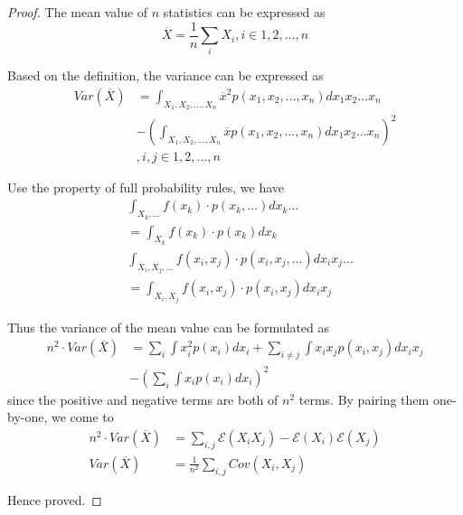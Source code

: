 \documentclass[../concepts.tex]{subfiles}
\begin{document}
\begin{proof}
    The mean value of $n$ statistics can be expressed as
    \begin{equation*}
        \overline{X} = \frac{1}{n} \sum_{i} X_i,
        i \in 1, 2, \dots, n
    \end{equation*}

    Based on the definition, the variance can be expressed as
    \begin{align*}
        Var(\overline{X}) & =  \int_{X_1, X_2, \dots, X_n} {\overline{x}}^2 p(x_1, x_2, \dots, x_n) dx_1 x_2 \dots x_n \\
                          & - (\int_{X_1, X_2, \dots, X_n} \overline{x} p(x_1, x_2, \dots, x_n) dx_1 x_2 \dots x_n)^2  \\
                          & , i, j \in 1, 2, \dots, n
    \end{align*}

    Use the property of full probability rules, we have
    \begin{align*}
         & \int_{X_k, \dots} f(x_k) \cdot p(x_k, \dots) dx_k \dots                    \\
         & = \int_{X_k} f(x_k) \cdot p(x_k) dx_k                                      \\
         & \int_{X_i, X_j, \dots} f(x_i, x_j) \cdot p(x_i, x_j, \dots) dx_i x_j \dots \\
         & = \int_{X_i, X_j} f(x_i, x_j) \cdot p(x_i, x_j) dx_i x_j
    \end{align*}

    Thus the variance of the mean value can be formulated as
    \begin{align*}
        n^2 \cdot Var(\overline{X}) & = \sum_i \int x_i^2 p(x_i) dx_i + \sum_{i \neq j} \int x_i x_j p(x_i, x_j) dx_i x_j \\
                                    & - (\sum_i \int x_i p(x_i) dx_i)^2
    \end{align*}
    since the positive and negative terms are both of $n^2$ terms.
    By pairing them one-by-one, we come to
    \begin{align*}
        n^2 \cdot Var(\overline{X}) & = \sum_{i, j} \mathcal{E}(X_i X_j) - \mathcal{E}(X_i)\mathcal{E}(X_j) \\
        Var(\overline{X})           & = \frac{1}{n^2} \sum_{i, j} Cov(X_i, X_j)
    \end{align*}

    Hence proved.
\end{proof}

\end{document}
